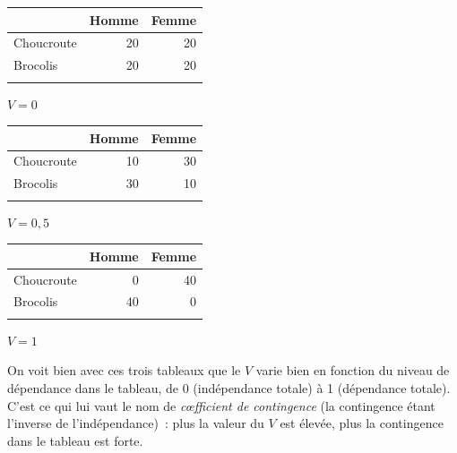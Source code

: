 \documentclass[a4paper,10pt,twoside,francais]{report}
\begin{document}
\begin{center}
  \hfill
  \begin{minipage}[c]{.3\linewidth}
    \footnotesize
    \begin{center}
    \begin{tabular}[!h]{lrr}
      \toprule
      & Homme & Femme \\
      \midrule
      Choucroute & 20 & 20  \\
      Brocolis & 20 & 20  \\
      \bottomrule\\
    \end{tabular}
    $V=0$
  \end{center}
\end{minipage} 
  \hfill
  \begin{minipage}[c]{.3\linewidth}
    \footnotesize
    \begin{center}
    \begin{tabular}[!h]{lrr}
      \toprule
      & Homme & Femme \\
      \midrule
      Choucroute & 10 & 30  \\
      Brocolis & 30 & 10  \\
      \bottomrule\\
    \end{tabular}
    $V=0,5$
    \end{center}
\end{minipage} 
  \hfill
  \begin{minipage}[c]{.3\linewidth}
    \footnotesize
    \begin{center}
    \begin{tabular}[!h]{lrr}
      \toprule
      & Homme & Femme \\
      \midrule
      Choucroute & 0 & 40  \\
      Brocolis & 40 & 0  \\
      \bottomrule\\
    \end{tabular}
    $V=1$
  \end{center}
\end{minipage} 
  \hfill
\end{center}

On voit bien avec ces trois tableaux que le $V$ varie bien en fonction
du niveau de dépendance dans le tableau, de 0 (indépendance totale) à
1 (dépendance totale). C'est ce qui lui vaut le nom de
\textit{c\oe{}fficient de contingence} (la contingence étant l'inverse
de l'indépendance)~: plus la valeur du $V$ est élevée, plus la
contingence dans le tableau est forte.
\end{document}
